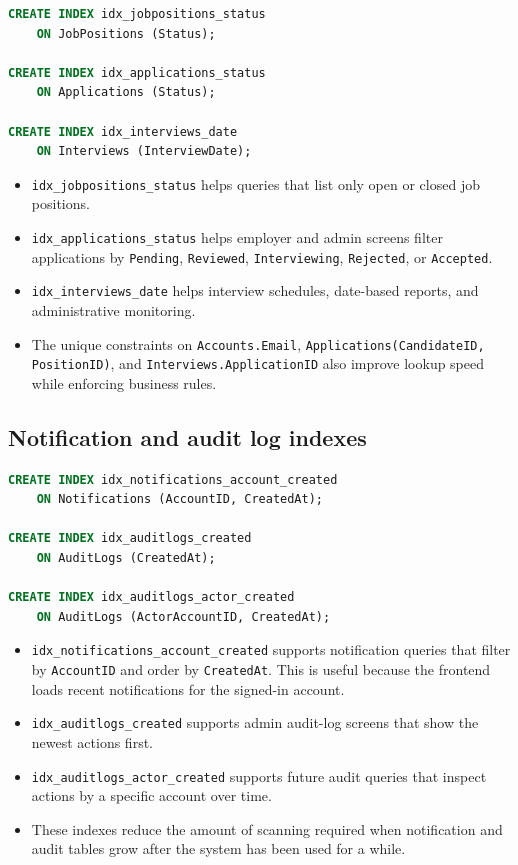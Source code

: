 \documentclass[11pt,a4paper]{report}
\begin{document}
\begin{lstlisting}[language=SQL,caption={Indexes used for filtering jobs, applications, and interviews}]
CREATE INDEX idx_jobpositions_status
    ON JobPositions (Status);

CREATE INDEX idx_applications_status
    ON Applications (Status);

CREATE INDEX idx_interviews_date
    ON Interviews (InterviewDate);
\end{lstlisting}

\begin{itemize}[leftmargin=1.2cm,itemsep=0.1em]
  \item \texttt{idx\_jobpositions\_status} helps queries that list only open or closed job positions.
  \item \texttt{idx\_applications\_status} helps employer and admin screens filter applications by \texttt{Pending}, \texttt{Reviewed}, \texttt{Interviewing}, \texttt{Rejected}, or \texttt{Accepted}.
  \item \texttt{idx\_interviews\_date} helps interview schedules, date-based reports, and administrative monitoring.
  \item The unique constraints on \texttt{Accounts.Email}, \texttt{Applications(CandidateID, PositionID)}, and \texttt{Interviews.ApplicationID} also improve lookup speed while enforcing business rules.
\end{itemize}

\subsection*{Notification and audit log indexes}

\begin{lstlisting}[language=SQL,caption={Indexes used for notifications and audit logs}]
CREATE INDEX idx_notifications_account_created
    ON Notifications (AccountID, CreatedAt);

CREATE INDEX idx_auditlogs_created
    ON AuditLogs (CreatedAt);

CREATE INDEX idx_auditlogs_actor_created
    ON AuditLogs (ActorAccountID, CreatedAt);
\end{lstlisting}

\begin{itemize}[leftmargin=1.2cm,itemsep=0.1em]
  \item \texttt{idx\_notifications\_account\_created} supports notification queries that filter by \texttt{AccountID} and order by \texttt{CreatedAt}. This is useful because the frontend loads recent notifications for the signed-in account.
  \item \texttt{idx\_auditlogs\_created} supports admin audit-log screens that show the newest actions first.
  \item \texttt{idx\_auditlogs\_actor\_created} supports future audit queries that inspect actions by a specific account over time.
  \item These indexes reduce the amount of scanning required when notification and audit tables grow after the system has been used for a while.
\end{itemize}
\end{document}
